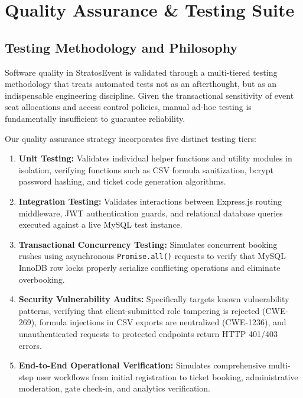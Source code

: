 \documentclass[11pt,a4paper]{report}
\begin{document}
\chapter{Quality Assurance \& Testing Suite}

\section{Testing Methodology and Philosophy}
\justifying
Software quality in StratosEvent is validated through a multi-tiered testing methodology that treats automated tests not as an afterthought, but as an indispensable engineering discipline. Given the transactional sensitivity of event seat allocations and access control policies, manual ad-hoc testing is fundamentally insufficient to guarantee reliability.

Our quality assurance strategy incorporates five distinct testing tiers:
\begin{enumerate}[leftmargin=1.5em, itemsep=0.4em]
    \item \textbf{Unit Testing:} Validates individual helper functions and utility modules in isolation, verifying functions such as CSV formula sanitization, bcrypt password hashing, and ticket code generation algorithms.
    \item \textbf{Integration Testing:} Validates interactions between Express.js routing middleware, JWT authentication guards, and relational database queries executed against a live MySQL test instance.
    \item \textbf{Transactional Concurrency Testing:} Simulates concurrent booking rushes using asynchronous \texttt{Promise.all()} requests to verify that MySQL InnoDB row locks properly serialize conflicting operations and eliminate overbooking.
    \item \textbf{Security Vulnerability Audits:} Specifically targets known vulnerability patterns, verifying that client-submitted role tampering is rejected (CWE-269), formula injections in CSV exports are neutralized (CWE-1236), and unauthenticated requests to protected endpoints return HTTP 401/403 errors.
    \item \textbf{End-to-End Operational Verification:} Simulates comprehensive multi-step user workflows from initial registration to ticket booking, administrative moderation, gate check-in, and analytics verification.
\end{enumerate}
\end{document}
